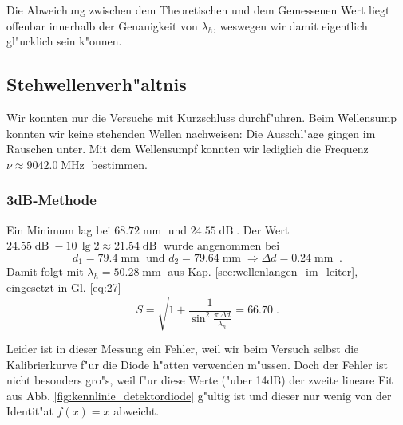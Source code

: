 \documentclass[a4paper,12pt]{article}
\newcommand{\folgt}{\ensuremath{\Rightarrow}}
\begin{document}
Die Abweichung zwischen dem Theoretischen und dem Gemessenen Wert
liegt offenbar innerhalb der Genauigkeit von $\lambda_h$, weswegen wir
damit eigentlich gl"ucklich sein k"onnen.







 

 
 \subsection{Stehwellenverh"altnis}
 \label{sec:stehwellenverhaltnis}

Wir konnten nur die Versuche mit Kurzschluss durchf"uhren. Beim
Wellensump konnten wir keine stehenden Wellen nachweisen: Die
Ausschl"age gingen im Rauschen unter. Mit dem Wellensumpf konnten wir
lediglich die Frequenz $\nu \approx 9042.0 \operatorname{MHz}$
bestimmen.




 \subsubsection{3dB-Methode}
 \label{sec:3db_methode}



Ein Minimum lag bei $68.72\operatorname{mm}$ und
$24.55\operatorname{dB}$. Der Wert $24.55\operatorname{dB} - 10 \, \lg
2 \approx 21.54\operatorname{dB}$ wurde angenommen bei 
\begin{equation*}
  d_1 = 79.4 \operatorname{mm} \text{ und } d_2 =
  79.64\operatorname{mm} \folgt \Delta d = 0.24\operatorname{mm}\;.
\end{equation*}
Damit folgt mit
$\lambda_h = 50.28\operatorname{mm}$ aus
Kap. \ref{sec:wellenlangen_im_leiter}, eingesetzt in Gl. \eqref{eq:27}
\begin{equation*}
  S = \sqrt{ 1 + \frac 1 {\sin^2 \frac{ \pi \, \Delta d } { \lambda_h
      } } } = 66.70 \;.
\end{equation*}




Leider ist in dieser Messung ein Fehler, weil wir beim Versuch
selbst die Kalibrierkurve f"ur die Diode h"atten verwenden
m"ussen. Doch der Fehler ist nicht besonders gro"s, weil f"ur diese
Werte ("uber 14dB) der zweite lineare Fit aus Abb.
\ref{fig:kennlinie_detektordiode} g"ultig ist und dieser nur wenig von
der Identit"at $f(x) = x$ abweicht.
\end{document}
